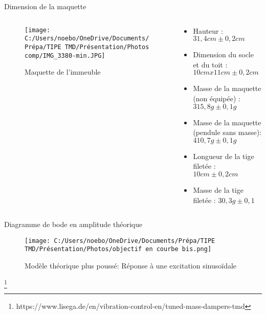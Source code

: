 \documentclass{beamer}
\begin{document}
\begin{frame}{Dimension de la maquette}
			\begin{columns}
		\begin{column}{0.5\textwidth}
			\begin{figure}
				\texttt{[image: C:/Users/noebo/OneDrive/Documents/Prépa/TIPE TMD/Présentation/Photos comp/IMG\_3380-min.JPG]}
				\caption{Maquette de l'immeuble}
			\end{figure}
		\end{column}
		\begin{column}{0.5\textwidth}
			\begin{itemize}
				\item  Hauteur : $31,4 cm \pm 0,2 cm$
				\item  Dimension du socle et du toit : $10 cm x 11 cm \pm 0,2 cm$
				\item Masse de la maquette (non équipée) :$ 315,8 g \pm 0,1g $
				\item Masse de la maquette (pendule sans masse): $410,7 g \pm 0,1 g$
				\item Longueur de la tige filetée : $10cm \pm 0,2cm$
				\item Masse de la tige filetée : $ 30,3 g \pm 0,1$
			\end{itemize}
			
		\end{column}
	\end{columns}
\end{frame}

\begin{frame}{Diagramme de bode en amplitude théorique}
	
	\vspace{12pt}
	\begin{figure}
		\texttt{[image: C:/Users/noebo/OneDrive/Documents/Prépa/TIPE TMD/Présentation/Photos/objectif en courbe bis.png]}
		\caption{Modèle théorique plus poussé: Réponse à une excitation sinusoïdale}
	\end{figure}
\footnote{\tiny https://www.lisega.de/en/vibration-control-en/tuned-mass-dampers-tmd}
\end{frame}
\end{document}
